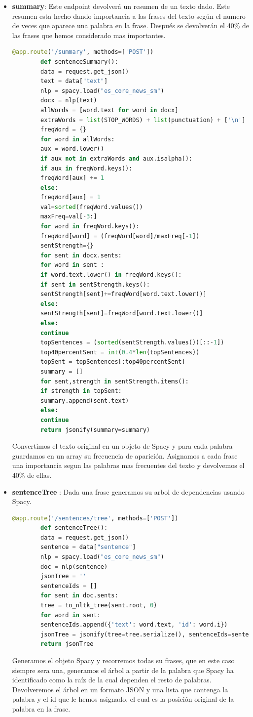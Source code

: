 \begin{itemize}
	\item \textbf{summary}\label{summary}: Este endpoint devolverá un resumen de un texto dado. Este resumen esta hecho dando importancia a las frases del texto según el numero de veces que aparece una palabra en la frase. Después se devolverán el 40\% de las frases que hemos considerado mas importantes.
	\begin{lstlisting}[language=Python]
		@app.route('/summary', methods=['POST'])
		def sentenceSummary():
		data = request.get_json()
		text = data["text"]
		nlp = spacy.load("es_core_news_sm")
		docx = nlp(text)
		allWords = [word.text for word in docx]
		extraWords = list(STOP_WORDS) + list(punctuation) + ['\n']
		freqWord = {}
		for word in allWords:
		aux = word.lower()
		if aux not in extraWords and aux.isalpha():
		if aux in freqWord.keys():
		freqWord[aux] += 1
		else:
		freqWord[aux] = 1
		val=sorted(freqWord.values())
		maxFreq=val[-3:]
		for word in freqWord.keys():
		freqWord[word] = (freqWord[word]/maxFreq[-1])
		sentStrength={}
		for sent in docx.sents:
		for word in sent :
		if word.text.lower() in freqWord.keys():
		if sent in sentStrength.keys():
		sentStrength[sent]+=freqWord[word.text.lower()]
		else:
		sentStrength[sent]=freqWord[word.text.lower()]
		else:
		continue
		topSentences = (sorted(sentStrength.values())[::-1])
		top40percentSent = int(0.4*len(topSentences))
		topSent = topSentences[:top40percentSent]
		summary = []
		for sent,strength in sentStrength.items():
		if strength in topSent:
		summary.append(sent.text)
		else:
		continue
		return jsonify(summary=summary)
	\end{lstlisting}
	Convertimos el texto original en un objeto de Spacy y para cada palabra guardamos en un array su frecuencia de aparición.
	Asignamos a cada frase una importancia segun las palabras mas frecuentes del texto y devolvemos el 40\% de ellas.
	
	\item \textbf{sentenceTree} \label{sentencesTree}: Dada una frase generamos su arbol de dependencias usando Spacy.
	\begin{lstlisting}[language=Python]
		@app.route('/sentences/tree', methods=['POST'])
		def sentenceTree():
		data = request.get_json()
		sentence = data["sentence"]
		nlp = spacy.load("es_core_news_sm")
		doc = nlp(sentence)
		jsonTree = ''
		sentenceIds = []
		for sent in doc.sents:
		tree = to_nltk_tree(sent.root, 0)
		for word in sent:
		sentenceIds.append({'text': word.text, 'id': word.i})
		jsonTree = jsonify(tree=tree.serialize(), sentenceIds=sentenceIds)
		return jsonTree
	\end{lstlisting}
	Generamos el objeto Spacy y recorremos todas su frases, que en este caso siempre sera una, generamos el árbol a partir de la palabra que Spacy ha identificado como la raíz de la cual dependen el resto de palabras. 
	Devolveremos el árbol en un formato JSON y una lista que contenga la palabra y el id que le hemos asignado, el cual es la posición original de la palabra en la frase.
	

\end{itemize}
